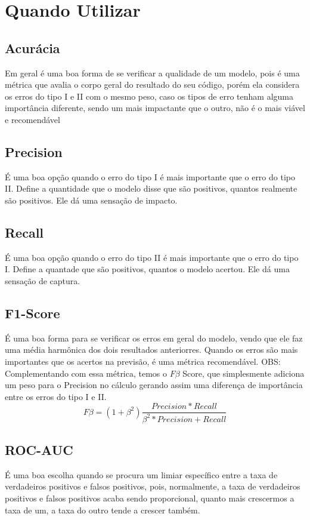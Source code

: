 \documentclass{article}
\begin{document}
\section{Quando Utilizar}


\subsection{Acurácia}
Em geral é uma boa forma de se verificar a qualidade de um modelo, pois é uma métrica que avalia o corpo geral do resultado do seu código, porém ela considera os erros do tipo I e II com o mesmo peso, caso os tipos de erro tenham alguma importância diferente, sendo um mais impactante que o outro, não é o mais viável e recomendável

\subsection{Precision}
É uma boa opção quando o erro do tipo I é mais importante que o erro do tipo II. Define a quantidade que o modelo disse que são positivos, quantos realmente são positivos. Ele dá uma sensação de impacto.

\subsection{Recall}
É uma boa opção quando o erro do tipo II é mais importante que o erro do tipo I. Define a quantade que são positivos, quantos o modelo acertou. Ele dá uma sensação de captura.

\subsection{F1-Score}
É uma boa forma para se verificar os erros em geral do modelo, vendo que ele faz uma média harmônica dos dois resultados anteriorres. Quando os erros são mais importantes que os acertos na previsão, é uma métrica recomendável. OBS: Complementando com essa métrica, temos o $F\beta$ Score, que simplesmente adiciona um peso para o Precision no cálculo gerando assim uma diferença de importância entre os erros do tipo I e II.
\begin{equation*}
    F\beta = (1+\beta^2)\frac{Precision*Recall}{\beta^2*Precision+ Recall}
\end{equation*}

\subsection{ROC-AUC}
É uma boa escolha quando se procura um limiar específico entre a taxa de verdadeiros positivos e falsos positivos, pois, normalmente, a taxa de verdadeiros positivos e falsos positivos acaba sendo proporcional, quanto mais crescermos a taxa de um, a taxa do outro tende a crescer também.
\end{document}
